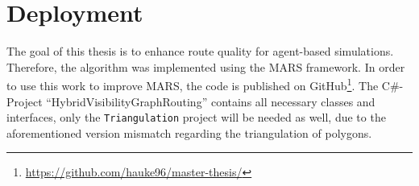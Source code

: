 \section{Deployment}

	The goal of this thesis is to enhance route quality for agent-based simulations.
	Therefore, the algorithm was implemented using the MARS framework.
	In order to use this work to improve MARS, the code is published on GitHub\footnote{\url{https://github.com/hauke96/master-thesis/}}.
	The C\#-Project \enquote{HybridVisibilityGraphRouting} contains all necessary classes and interfaces, only the \texttt{Triangulation} project will be needed as well, due to the aforementioned version mismatch regarding the triangulation of polygons.